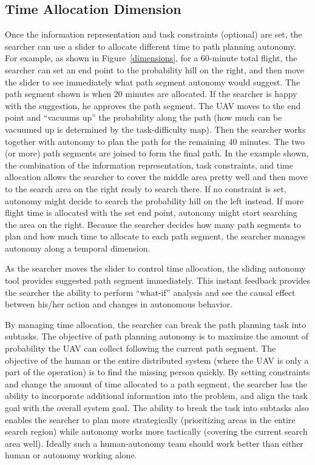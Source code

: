 \documentclass[journal]{IEEEtran}
\begin{document}
\subsection{Time Allocation Dimension}

Once the information representation and task constraints (optional) are set, the searcher can use a slider to allocate different time to path planning autonomy. For example, as shown in Figure~\ref{dimensions}, for a 60-minute total flight, the searcher can set an end point to the probability hill on the right, and then move the slider to see immediately what path segment autonomy would suggest. The path segment shown is when 20 minutes are allocated. If the searcher is happy with the suggestion, he approves the path segment. The UAV moves to the end point and ``vacuums up'' the probability along the path (how much can be vacuumed up is determined by the task-difficulty map). Then the searcher works together with autonomy to plan the path for the remaining 40 minutes. The two (or more) path segments are joined to form the final path. In the example shown, the combination of the information representation, task constraints, and time allocation allows the searcher to cover the middle area pretty well and then move to the search area on the right ready to search there. If no constraint is set, autonomy might decide to search the probability hill on the left instead. If more flight time is allocated with the set end point, autonomy might start searching the area on the right. Because the searcher decides how many path segments to plan and how much time to allocate to each path segment, the searcher manages autonomy along a temporal dimension.

As the searcher moves the slider to control time allocation, the sliding autonomy tool provides suggested path segment immediately. This instant feedback provides the searcher the ability to perform ``what-if'' analysis and see the causal effect between his/her action and changes in autonomous behavior. 

By managing time allocation, the searcher can break the path planning task into subtasks. The objective of path planning autonomy is to maximize the amount of probability the UAV can collect following the current path segment. The objective of the human or the entire distributed system (where the UAV is only a part of the operation) is to find the missing person quickly. By setting constraints and change the amount of time allocated to a path segment, the searcher has the ability to incorporate additional information into the problem, and align the task goal with the overall system goal. The ability to break the task into subtasks also enables the searcher to plan more strategically (prioritizing areas in the entire search region) while autonomy works more tactically (covering the current search area well). Ideally such a human-autonomy team should work better than either human or autonomy working alone.
\end{document}
